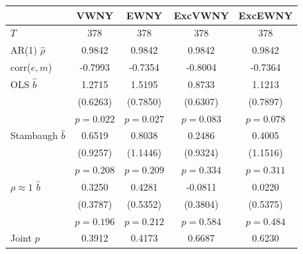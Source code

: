 \begin{tabular}{lcccc}
\toprule
 & VWNY & EWNY & ExcVWNY & ExcEWNY \\
\midrule
$T$ & 378 & 378 & 378 & 378 \\
AR(1) $\hat\rho$ & 0.9842 & 0.9842 & 0.9842 & 0.9842 \\
corr($e,m$) & -0.7993 & -0.7354 & -0.8004 & -0.7364 \\
\midrule
OLS $\hat b$ & 1.2715 & 1.5195 & 0.8733 & 1.1213 \\
 & (0.6263) & (0.7850) & (0.6307) & (0.7897) \\
 & $p=0.022$ & $p=0.027$ & $p=0.083$ & $p=0.078$ \\
Stambaugh $\hat b$ & 0.6519 & 0.8038 & 0.2486 & 0.4005 \\
 & (0.9257) & (1.1446) & (0.9324) & (1.1516) \\
 & $p=0.208$ & $p=0.209$ & $p=0.334$ & $p=0.311$ \\
$\rho\approx1$ $\hat b$ & 0.3250 & 0.4281 & -0.0811 & 0.0220 \\
 & (0.3787) & (0.5352) & (0.3804) & (0.5375) \\
 & $p=0.196$ & $p=0.212$ & $p=0.584$ & $p=0.484$ \\
\midrule
Joint $p$ & 0.3912 & 0.4173 & 0.6687 & 0.6230 \\
\bottomrule
\end{tabular}
